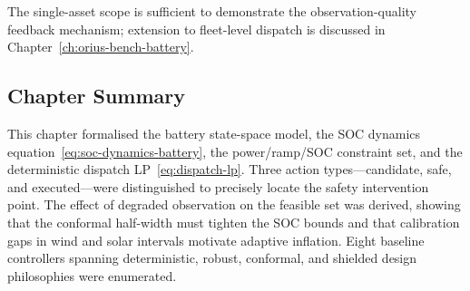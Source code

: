 The single-asset scope is sufficient to demonstrate the observation-quality
feedback mechanism; extension to fleet-level dispatch is discussed in
Chapter~\ref{ch:orius-bench-battery}.

\subsection{Chapter Summary}

This chapter formalised the battery state-space model, the SOC dynamics
equation~\eqref{eq:soc-dynamics-battery}, the power/ramp/SOC constraint set, and the
deterministic dispatch LP~\eqref{eq:dispatch-lp}.  Three action types---candidate,
safe, and executed---were distinguished to precisely locate the safety
intervention point.  The effect of degraded observation on the feasible set
was derived, showing that the conformal half-width must tighten the SOC bounds
and that calibration gaps in wind and solar intervals motivate adaptive
inflation.  Eight baseline controllers spanning deterministic, robust,
conformal, and shielded design philosophies were enumerated.

